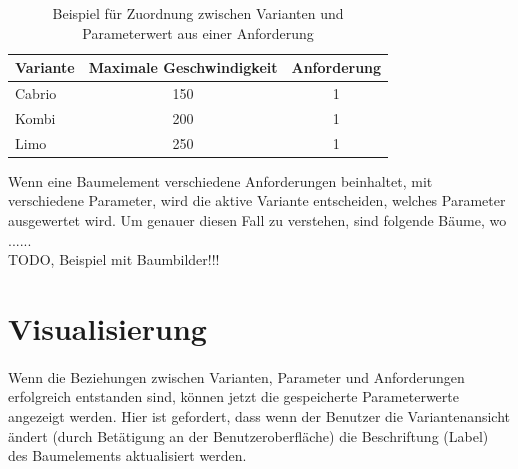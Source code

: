 \begin{table}[h]
\begin{center}
	\begin{tabular}{|l||c|c|}
	 \hline
	 Variante &Maximale Geschwindigkeit &Anforderung\\
	 \hline\hline
	 Cabrio   &150                      & 1\\
	 \hline
	 Kombi    &200                      & 1\\
	 \hline
	 Limo     &250                      & 1\\
	 \hline
	\end{tabular}
	
	\caption{Beispiel für Zuordnung zwischen Varianten und Parameterwert aus einer Anforderung}
	\label{table:4TestCases}
\end{center}
\end{table}

Wenn eine Baumelement verschiedene Anforderungen beinhaltet, mit verschiedene Parameter, wird die aktive Variante entscheiden, welches Parameter ausgewertet wird. Um genauer diesen Fall zu verstehen, sind folgende Bäume, wo ......\\

TODO, Beispiel mit Baumbilder!!!


\newpage
\section{Visualisierung}
\paragraph{}


Wenn die Beziehungen zwischen Varianten, Parameter und Anforderungen erfolgreich entstanden sind, können jetzt die gespeicherte Parameterwerte angezeigt werden. Hier ist gefordert, dass wenn der Benutzer die Variantenansicht ändert (durch Betätigung an der Benutzeroberfläche) die Beschriftung (Label) des Baumelements aktualisiert werden.\\




